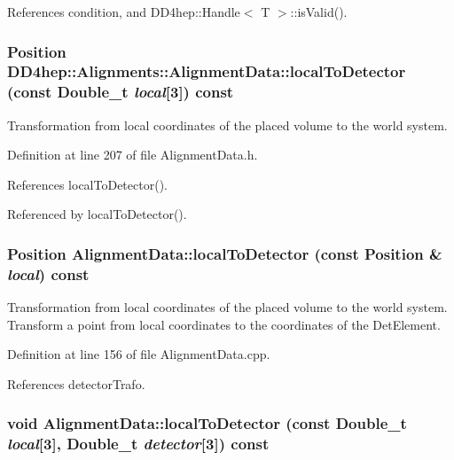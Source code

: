 References condition, and DD4hep::Handle$<$ T $>$::isValid().\hypertarget{class_d_d4hep_1_1_alignments_1_1_alignment_data_ad3c8fd50d266be9b24501058cddd920e}{
\subsubsection[{localToDetector}]{\setlength{\rightskip}{0pt plus 5cm}Position DD4hep::Alignments::AlignmentData::localToDetector (const Double\_\-t {\em local}\mbox{[}3\mbox{]}) const}}
\label{class_d_d4hep_1_1_alignments_1_1_alignment_data_ad3c8fd50d266be9b24501058cddd920e}


Transformation from local coordinates of the placed volume to the world system. 

Definition at line 207 of file AlignmentData.h.

References localToDetector().

Referenced by localToDetector().\hypertarget{class_d_d4hep_1_1_alignments_1_1_alignment_data_a62df459217b36f04ddcae69e63cabdc2}{
\subsubsection[{localToDetector}]{\setlength{\rightskip}{0pt plus 5cm}Position AlignmentData::localToDetector (const Position \& {\em local}) const}}
\label{class_d_d4hep_1_1_alignments_1_1_alignment_data_a62df459217b36f04ddcae69e63cabdc2}


Transformation from local coordinates of the placed volume to the world system. Transform a point from local coordinates to the coordinates of the DetElement. 

Definition at line 156 of file AlignmentData.cpp.

References detectorTrafo.\hypertarget{class_d_d4hep_1_1_alignments_1_1_alignment_data_a12bb4ad691f7ae0585b177291916cfde}{
\subsubsection[{localToDetector}]{\setlength{\rightskip}{0pt plus 5cm}void AlignmentData::localToDetector (const Double\_\-t {\em local}\mbox{[}3\mbox{]}, \/  Double\_\-t {\em detector}\mbox{[}3\mbox{]}) const}}
\label{class_d_d4hep_1_1_alignments_1_1_alignment_data_a12bb4ad691f7ae0585b177291916cfde}


